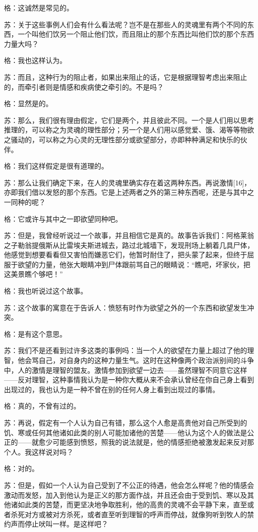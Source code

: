 \documentclass[12pt,oneside]{book}
\begin{document}
格：这诚然是常见的。

苏：关于这些事例人们会有什么看法呢？岂不是在那些人的灵魂里有两个不同的东西，一个叫他们饮另一个阻止他们饮，而且阻止的那个东西比叫他们饮的那个东西力量大吗？

格：我也这样认为。

苏：而且，这种行为的阻止者，如果出来阻止的话，它是根据理智考虑出来阻止的，而牵引者则是情感和疾病使之牵引的。不是吗？

格：显然是的。

苏：那么，我们很有理由假定，它们是两个，并且彼此不同。一个是人们用以思考推理的，可以称之为灵魂的理性部分；另一个是人们用以感觉爱、饿、渴等等物欲之骚动的，可以称之为心灵的无理性部分或欲望部分，亦即种种满足和快乐的伙伴。

格：我们这样假定是很有道理的。

苏：那么让我们确定下来，在人的灵魂里确实存在着这两种东西。再说激情[16]，亦即我们借以发怒的那个东西。它是上述两者之外的第三种东西呢，还是与其中之一同种的呢？

格：它或许与其中之一即欲望同种吧。

苏：但是，我曾经听说过一个故事，并且相信它是真的。故事告诉我们：阿格莱翁之子勒翁提俄斯从比雷埃夫斯进城去，路过北城墙下，发现刑场上躺着几具尸体，他感觉到想要看看但又害怕而嫌恶它们，他暂时耐住了，把头蒙了起来，但终于屈服于欲望的力量，他张大眼睛冲到尸体跟前骂自己的眼睛说：“瞧吧，坏家伙，把这美景瞧个够吧！”

格：我也听说过这个故事。

苏：这个故事的寓意在于告诉人：愤怒有时作为欲望之外的一个东西和欲望发生冲突。

格：是有这个意思。

苏：我们不是还看到过许多这类的事例吗：当一个人的欲望在力量上超过了他的理智，他会骂自己，对自身内的这种力量生气。这时在这种像两个政治派别间的斗争中，人的激情是理智的盟友。激情参加到欲望一边去——虽然理智不同意它这样——反对理智，这种事情我认为是一种你大概从来不会承认曾经在你自己身上看到出现过的，我也认为是一种不曾在别的任何人身上看到出现过的事情。

格：真的，不曾有过的。

苏：再说，假定有一个人认为自己有错，那么这个人愈是高贵他对自己所受到的饥、寒或任何其他诸如此类的别人可能加诸他的苦楚——他认为这个人的做法是公正的——就愈少可能感到愤怒，照我的说法就是，他的情感拒绝被激发起来反对那个人。我这样说对吗？

格：对的。

苏：但是，假如一个人认为自己受到了不公正的待遇，他会怎么样呢？他的情感会激动而发怒，加入到他认为是正义的那方面作战，并且还会由于受到饥、寒以及其他诸如此类的苦楚，而更坚决地争取胜利，他的高贵的灵魂不会平静下来，直至或者杀死对方或被对方杀死，或者直至听到理智的呼声而停战，就像狗听到牧人的禁约声而停止吠叫一样。是这样吧？
\end{document}
